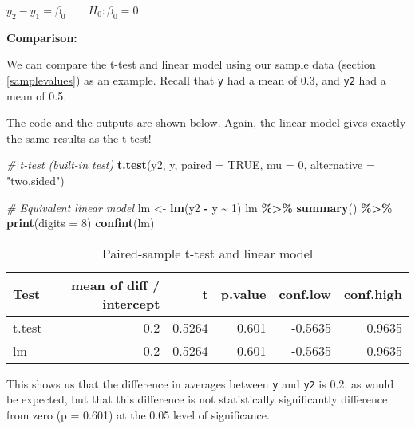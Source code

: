 \documentclass[
  12pt,
]{krantz}
\newenvironment{Shaded}{\begin{snugshade}}{\end{snugshade}}
\newcommand{\CommentTok}[1]{\textcolor[rgb]{0.56,0.35,0.01}{\textit{#1}}}
\newcommand{\DataTypeTok}[1]{\textcolor[rgb]{0.13,0.29,0.53}{#1}}
\newcommand{\DecValTok}[1]{\textcolor[rgb]{0.00,0.00,0.81}{#1}}
\newcommand{\KeywordTok}[1]{\textcolor[rgb]{0.13,0.29,0.53}{\textbf{#1}}}
\newcommand{\NormalTok}[1]{#1}
\newcommand{\OperatorTok}[1]{\textcolor[rgb]{0.81,0.36,0.00}{\textbf{#1}}}
\newcommand{\OtherTok}[1]{\textcolor[rgb]{0.56,0.35,0.01}{#1}}
\newcommand{\StringTok}[1]{\textcolor[rgb]{0.31,0.60,0.02}{#1}}
\begin{document}
\begin{center}

\(y_2 - y_1 = \beta_0 \qquad H_0: \beta_0 = 0\)

\end{center}

\textbf{Comparison:}

We can compare the t-test and linear model using our sample data (section \ref{samplevalues}) as an example. Recall that \texttt{y} had a mean of 0.3, and \texttt{y2} had a mean of 0.5.

The code and the outputs are shown below. Again, the linear model gives exactly the same results as the t-test!

\begin{Shaded}
\begin{Highlighting}[]
\CommentTok{\# t{-}test (built{-}in test)}
\KeywordTok{t.test}\NormalTok{(y2, y, }\DataTypeTok{paired =} \OtherTok{TRUE}\NormalTok{, }\DataTypeTok{mu =} \DecValTok{0}\NormalTok{, }\DataTypeTok{alternative =} \StringTok{"two.sided"}\NormalTok{)}

\CommentTok{\# Equivalent linear model}
\NormalTok{lm \textless{}{-}}\StringTok{ }\KeywordTok{lm}\NormalTok{(y2 }\OperatorTok{{-}}\StringTok{ }\NormalTok{y }\OperatorTok{\textasciitilde{}}\StringTok{ }\DecValTok{1}\NormalTok{)}
\NormalTok{  lm }\OperatorTok{\%\textgreater{}\%}\StringTok{ }\KeywordTok{summary}\NormalTok{() }\OperatorTok{\%\textgreater{}\%}\StringTok{ }\KeywordTok{print}\NormalTok{(}\DataTypeTok{digits =} \DecValTok{8}\NormalTok{)}
  \KeywordTok{confint}\NormalTok{(lm)}
\end{Highlighting}
\end{Shaded}

\begin{table}

\caption{\label{tab:unnamed-chunk-25}Paired-sample t-test and linear model}
\centering
\begin{tabular}[t]{lrrrrr}
\toprule
Test & mean of diff / intercept & t & p.value & conf.low & conf.high\\
\midrule
t.test & 0.2 & 0.5264 & 0.601 & -0.5635 & 0.9635\\
lm & 0.2 & 0.5264 & 0.601 & -0.5635 & 0.9635\\
\bottomrule
\end{tabular}
\end{table}

This shows us that the difference in averages between \texttt{y} and \texttt{y2} is 0.2, as would be expected, but that this difference is not statistically significantly difference from zero (p = 0.601) at the 0.05 level of significance.
\end{document}
